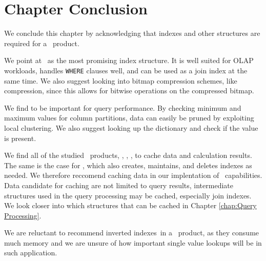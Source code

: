 



\section{Chapter Conclusion}
\label{sec:Chapter Conclusion}
We conclude this chapter by acknowledging that indexes and other structures are required for a \bd~product.

We point at \biti~as the most promising index structure. It is well suited for OLAP workloads, handles \texttt{WHERE} clauses well, and can be used as a join index at the same time. We also suggest looking into bitmap compression schemes, like  compression, since this allows for bitwise operations on the compressed bitmap.

We find  to be important for query performance. By checking minimum and maximum values for column partitions, data can easily be pruned by exploiting local clustering. We also suggest looking up the dictionary and check if the value is present.

We find all of the studied \bd~products, \qlikview, \powerpivot, \tableau, to cache data and calculation results. The same is the case for \exasol, which also creates, maintains, and deletes indexes as needed. We therefore reccomend caching data in our implentation of \bd~capabilities. Data candidate for caching are not limited to query results, intermediate structures used in the query processing may be cached, especially join indexes. We look closer into which structures that can be cached in Chapter \ref{chap:Query Processing}.

We are reluctant to recommend inverted indexes~in a \bd~product, as they consume much memory and we are unsure of how important single value lookups will be in such application.


